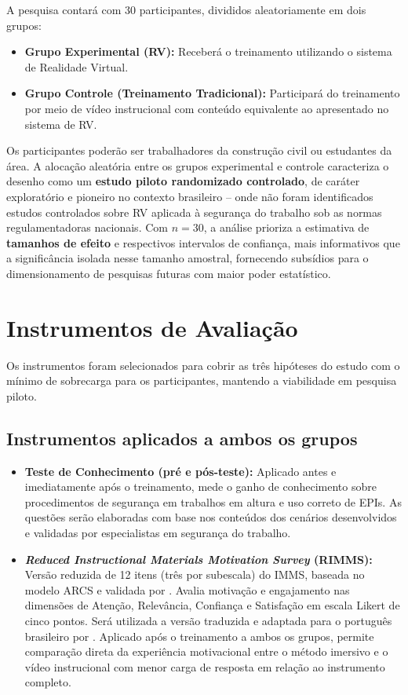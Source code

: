 A pesquisa contará com 30 participantes, divididos aleatoriamente em dois grupos:

\begin{itemize}
    \item \textbf{Grupo Experimental (RV):} Receberá o treinamento utilizando o sistema de Realidade Virtual.
    \item \textbf{Grupo Controle (Treinamento Tradicional):} Participará do treinamento por meio de vídeo instrucional com conteúdo equivalente ao apresentado no sistema de RV.
\end{itemize}

Os participantes poderão ser trabalhadores da construção civil ou estudantes da área. A alocação aleatória entre os grupos experimental e controle caracteriza o desenho como um \textbf{estudo piloto randomizado controlado}, de caráter exploratório e pioneiro no contexto brasileiro -- onde não foram identificados estudos controlados sobre RV aplicada à segurança do trabalho sob as normas regulamentadoras nacionais. Com $n = 30$, a análise prioriza a estimativa de \textbf{tamanhos de efeito} e respectivos intervalos de confiança, mais informativos que a significância isolada nesse tamanho amostral, fornecendo subsídios para o dimensionamento de pesquisas futuras com maior poder estatístico.

\section{Instrumentos de Avaliação}

Os instrumentos foram selecionados para cobrir as três hipóteses do estudo com o mínimo de sobrecarga para os participantes, mantendo a viabilidade em pesquisa piloto.

\subsection{Instrumentos aplicados a ambos os grupos}

\begin{itemize}
    \item \textbf{Teste de Conhecimento (pré e pós-teste):} Aplicado antes e imediatamente após o treinamento, mede o ganho de conhecimento sobre procedimentos de segurança em trabalhos em altura e uso correto de EPIs. As questões serão elaboradas com base nos conteúdos dos cenários desenvolvidos e validadas por especialistas em segurança do trabalho.
    \item \textbf{\textit{Reduced Instructional Materials Motivation Survey} (RIMMS):} Versão reduzida de 12 itens (três por subescala) do IMMS, baseada no modelo ARCS \cite{keller1987} e validada por . Avalia motivação e engajamento nas dimensões de Atenção, Relevância, Confiança e Satisfação em escala Likert de cinco pontos. Será utilizada a versão traduzida e adaptada para o português brasileiro por . Aplicado após o treinamento a ambos os grupos, permite comparação direta da experiência motivacional entre o método imersivo e o vídeo instrucional com menor carga de resposta em relação ao instrumento completo.
\end{itemize}

